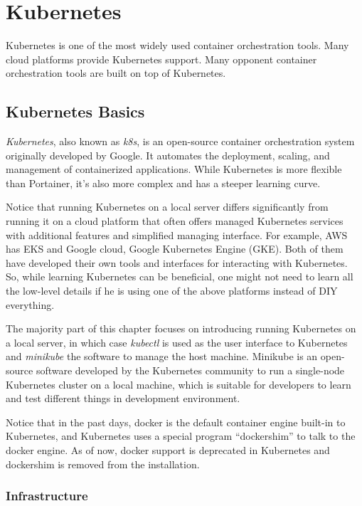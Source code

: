 \chapter{Kubernetes}

Kubernetes is one of the most widely used container orchestration tools. Many cloud platforms provide Kubernetes support. Many opponent container orchestration tools are built on top of Kubernetes.

\section{Kubernetes Basics}

\textit{Kubernetes}, also known as \textit{k8s}, is an open-source container orchestration system originally developed by Google. It automates the deployment, scaling, and management of containerized applications. While Kubernetes is more flexible than Portainer, it's also more complex and has a steeper learning curve.

Notice that running Kubernetes on a local server differs significantly from running it on a cloud platform that often offers managed Kubernetes services with additional features and simplified managing interface. For example, AWS has EKS and Google cloud, Google Kubernetes Engine (GKE). Both of them have developed their own tools and interfaces for interacting with Kubernetes. So, while learning Kubernetes can be beneficial, one might not need to learn all the low-level details if he is using one of the above platforms instead of DIY everything.

The majority part of this chapter focuses on introducing running Kubernetes on a local server, in which case \textit{kubectl} is used as the user interface to Kubernetes and \textit{minikube} the software to manage the host machine. Minikube is an open-source software developed by the Kubernetes community to run a single-node Kubernetes cluster on a local machine, which is suitable for developers to learn and test different things in development environment.

Notice that in the past days, docker is the default container engine built-in to Kubernetes, and Kubernetes uses a special program ``dockershim'' to talk to the docker engine. As of now, docker support is deprecated in Kubernetes and dockershim is removed from the installation.

\subsection{Infrastructure}

